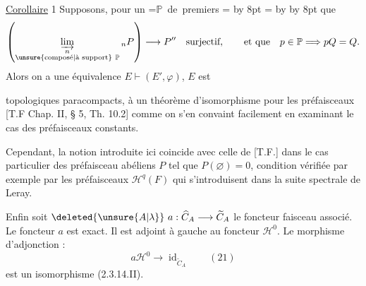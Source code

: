 \uline{Corollaire} 1 Supposons, pour un \begingroup
{}=\hbox{$\mathbb{P}$ de  premiers}
= \advance{} by 8pt
= \advance{} by  \advance{} by 8pt
\leavevmode{}%
\kern4pt\kern4pt\endgroup que
\[\left(\varinjlim_{\substack{n\\\text{\unsure{composé|à support}}\ \mathbb{P}}}{}_nP\right)\longrightarrow P''\quad\text{surjectif},\qquad\text{et que}\quad p\in\mathbb{P}\Longrightarrow pQ=Q.\]
Alors on a une équivalence $E\vdash(E',\varphi)$,  $E$ est 

topologiques paracompacts, à un théorème d'isomorphisme pour les  préfaisceaux [T.F Chap. II, § 5, Th. 10.2] comme on s'en convaint facilement en examinant le cas des préfaisceaux constants.

Cependant, la notion introduite ici coincide avec celle de [T.F.] dans le cas particulier des préfaisceau abéliens $P$ tel que $P(\varnothing)=0$, condition vérifiée par exemple par les préfaisceaux $\mathcal H^q(F)$  qui s'introduisent dans la suite spectrale de Leray.

Enfin soit $\deleted{\unsure{A|\lambda}}\ a:\widehat C_A\longrightarrow\widetilde C_A$ le foncteur faisceau associé. Le foncteur $a$ est exact. Il est adjoint à gauche au foncteur $\mathcal H^0$. Le morphisme d'adjonction :
\[a\mathcal H^0\longrightarrow\operatorname{id}_{\widetilde C_A}\qquad(21)\]
est un isomorphisme (2.3.14.II).

